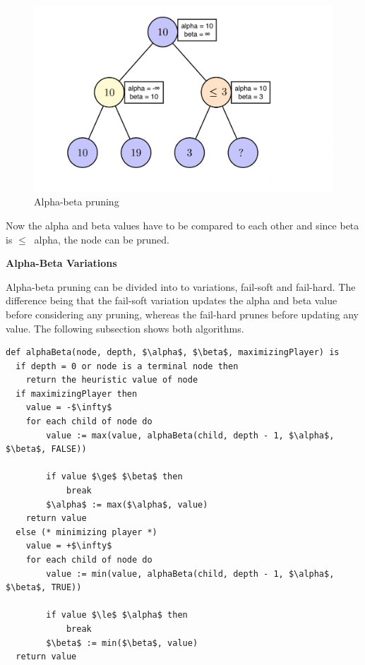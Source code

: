 \documentclass[conference,pdf,table,xcdraw, utf8]{IEEEtran}
\begin{document}
\begin{figure}[H]
    \centering
    \includegraphics[scale=0.23]{images/pruning_tree4.png}
    \caption{Alpha-beta pruning}
    \label{figure:pruning4}
\end{figure}

Now the alpha and beta values have to be compared to each other and since beta is $\leq \ $ alpha, the node can be pruned.



\vspace{1em}
\textbf{Alpha-Beta Variations}

Alpha-beta pruning can be divided into to variations, fail-soft and fail-hard. The difference being that the fail-soft variation updates the alpha and beta value before considering any pruning, whereas the fail-hard prunes before updating any value.
The following subsection shows both algorithms.

\begin{lstlisting}[linewidth=\columnwidth,breaklines=true,mathescape=true,
caption=Fail-hard variation]
def alphaBeta(node, depth, $\alpha$, $\beta$, maximizingPlayer) is
  if depth = 0 or node is a terminal node then
    return the heuristic value of node
  if maximizingPlayer then
    value = -$\infty$
    for each child of node do
        value := max(value, alphaBeta(child, depth - 1, $\alpha$, $\beta$, FALSE))
        
        if value $\ge$ $\beta$ then
            break
        $\alpha$ := max($\alpha$, value)
    return value
  else (* minimizing player *)
    value = +$\infty$
    for each child of node do
        value := min(value, alphaBeta(child, depth - 1, $\alpha$, $\beta$, TRUE))
                                  
        if value $\le$ $\alpha$ then
            break
        $\beta$ := min($\beta$, value)
  return value
\end{lstlisting}
\end{document}
